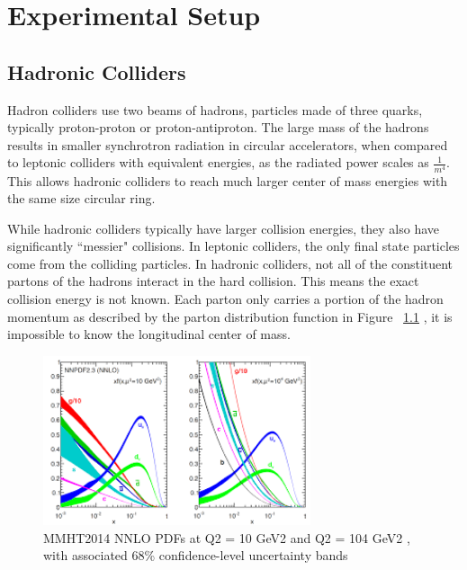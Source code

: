 \chapter{Experimental Setup}
\section{Hadronic Colliders}
Hadron colliders use two beams of hadrons, particles made of three quarks, typically proton-proton or proton-antiproton. The large mass of the hadrons results in smaller synchrotron radiation in circular accelerators, when compared to leptonic colliders with equivalent energies, as the radiated power scales as ${\frac{1}{m^{4}}}$. This allows hadronic colliders to reach much larger center of mass energies with the same size circular ring. \newline

\indent While hadronic colliders typically have larger collision energies, they also have significantly ``messier" collisions. In leptonic colliders, the only final state particles come from the colliding particles. In hadronic colliders, not all of the constituent partons of the hadrons interact in the hard collision. This means the exact collision energy is not known. Each parton only carries a portion of the hadron momentum as described by the parton distribution  function in Figure ~\ref{fig:pdf} , it is impossible to know the longitudinal center of mass. 

\begin{figure}[h]
\begin{center}
\includegraphics*[width=0.70\textwidth] {figures/pdf}
\caption[MMHT2014 NNLO PDFs at Q2 = 10 GeV2
and Q2 = 104 GeV2
, with associated 68\%
confidence-level uncertainty bands \cite{Harland-Lang:2014zoa}]{MMHT2014 NNLO PDFs at Q2 = 10 GeV2
and Q2 = 104 GeV2
, with associated 68\%
confidence-level uncertainty bands \cite{Harland-Lang:2014zoa}}
\label{fig:pdf}
\end{center}
\end{figure}



